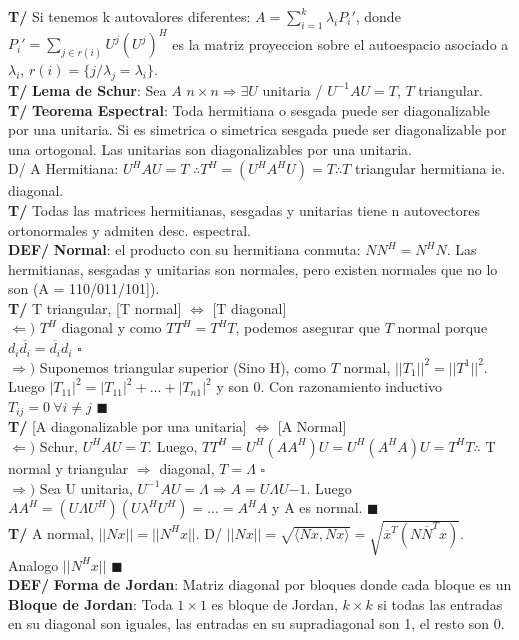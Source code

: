\documentclass[10pt,a4paper]{article}
\newcommand*{\QEDA}{\null\nobreak\hfill\ensuremath{\blacksquare}}
\newcommand*{\QEDB}{\null\nobreak\hfill\ensuremath{\square}}
\begin{document}
\textbf{T/} Si tenemos k autovalores diferentes: $A = \sum_{i=1}^k \lambda_i P_i'$, donde $P_i' = \sum_{j \in r(i)} U^j(U^j)^H$ es la matriz proyeccion sobre el autoespacio asociado a $\lambda_i$, $r(i) = \{j / \lambda_j = \lambda_i\}$.\\
\textbf{T/} \textbf{Lema de Schur}: Sea $A$ $n \times n \Rightarrow \exists U $ unitaria / $U^{-1}AU = T$, $T$ triangular.\\
\textbf{T/} \textbf{Teorema Espectral}: Toda hermitiana o sesgada puede ser diagonalizable por una unitaria. Si es simetrica o simetrica sesgada puede ser diagonalizable por una ortogonal. Las unitarias son diagonalizables por una unitaria.\\
D/ A Hermitiana: $U^HAU=T$ $\therefore T^H=(U^HA^HU)=T \therefore T$ triangular hermitiana ie. diagonal.\\
\textbf{T/} Todas las matrices hermitianas, sesgadas y unitarias tiene n autovectores ortonormales y admiten desc. espectral.\\
\textbf{DEF/} \textbf{Normal}: el producto con su hermitiana conmuta: $NN^H=N^HN$. Las hermitianas, sesgadas y unitarias son normales, pero existen normales que no lo son (A = 110/011/101]).\\
\textbf{T/} T triangular, [T normal] $\iff$ [T diagonal]\\
$\Leftarrow)$ $T^H$ diagonal y como $TT^H=T^HT$, podemos asegurar que $T$ normal porque $d_i\overline{d_i} = \overline{d_i}d_i$ \QEDB\\
$\Rightarrow)$ Suponemos triangular superior (Sino H), como $T$ normal, $||T_1||^2=||T^1||^2$. Luego $|T_{11}|^2 = |T_{11}|^2 + ... + |T_{n1}|^2$ y son 0. Con razonamiento inductivo $T_{ij} = 0\ \forall i \not = j$ \QEDA\\
\textbf{T/} [A diagonalizable por una unitaria] $\iff$ [A Normal]\\
$\Leftarrow)$ Schur, $U^HAU=T$. Luego, $TT^H = U^H(AA^H)U = U^H(A^HA)U = T^HT \therefore$ T normal y triangular $\Rightarrow$ diagonal, $T=\Lambda$ \QEDB\\
$\Rightarrow)$ Sea U unitaria, $U^{-1}AU=\Lambda \Rightarrow A=U\Lambda U{-1}$. Luego $AA^H = (U\Lambda U^H)(U\lambda^H U^H)=...=A^HA$ y A es normal. \QEDA\\
\textbf{T/} A normal, $||Nx||=||N^Hx||$. D/ $||Nx|| = \sqrt{\langle Nx,Nx \rangle} = \sqrt{\overline{x}^T(N\overline{N}^Tx)}$. Analogo $||N^Hx||$ \QEDA\\
\textbf{DEF/} \textbf{Forma de Jordan}: Matriz diagonal por bloques donde cada bloque es un \textbf{Bloque de Jordan}: Toda $1\times1$ es bloque de Jordan, $k\times k$ si todas las entradas en su diagonal son iguales, las entradas en su supradiagonal son 1, el resto son 0.\\
\end{document}

